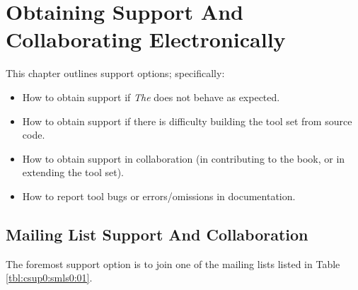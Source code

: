 %
\chapter[Support And Collaboration]
        {Obtaining Support And Collaborating Electronically}
\label{csup0}

This chapter outlines support options; specifically:

\begin{itemize}
\item How to obtain support if \emph{The \tsname{}} does not
      behave as expected.
\item How to obtain support if there is difficulty building the
      tool set from source code.
\item How to obtain support in collaboration (in contributing to 
      the book, or in extending the tool set).
\item How to report tool bugs or errors/omissions in documentation.
\end{itemize}

\section{Mailing List Support And Collaboration}
\label{csup0:smls0}

The foremost support option is to join one of the mailing lists
listed in Table \ref{tbl:csup0:smls0:01}.

